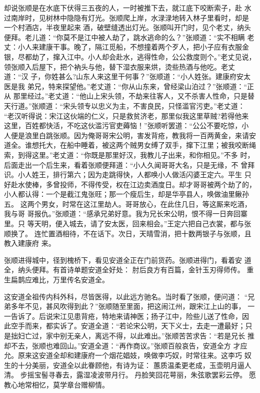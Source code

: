 却说张顺是在水底下伏得三五夜的人，一时被推下去，就江底下咬断索子，赴
水过南岸时，见树林中隐隐有灯光。张顺爬上岸，水渌渌地转入林子里看时，却是
一个村酒店，半夜里起来酒，破壁缝透出灯光。张顺叫开门时，见个老丈，纳头
便拜。老儿道：“你莫不是江中被人劫了，跳水逃命的么？”张顺道：“实不相瞒
老丈：小人来建康干事。晚了，隔江觅船，不想撞着两个歹人，把小子应有衣服金
银，尽都劫了，撺入江中。小人却会赴水，逃得性命，公公救度则个。”老丈见说，
领张顺入后屋下，把个衲头与他，替下湿衣服来烘，烫些热酒与他吃。老丈道：“汉
子，你姓甚么?山东人来这里干何事？”张顺道：“小人姓张。建康府安太医是我
弟兄，特来探望他。”老丈道：“你从山东来，曾经梁山泊过？”张顺道：“正从
那里经过。”老丈道：“他山上宋头领，不劫来往客人，又不杀害人性命，只是替
天行道。”张顺道：“宋头领专以忠义为主，不害良民，只怪滥官污吏。”老丈道：
“老汉听得说：宋江这伙端的仁义，只是救贫济老，那里似我这里草贼?若得他来
这里，百姓都快活，不吃这伙滥污官吏薅恼！”张顺听罢道：“公公不要吃惊，小
人便是浪里白跳张顺。因为俺哥哥宋公明，害发背疮，教我将一百两黄金，来请安
道全。谁想托大，在船中睡着，被这两个贼男女缚了双手，撺下江里；被我咬断绳
索，到得这里。”老丈道：“你既是那里好汉，我教儿子出来，和你相见。”不多
时，后面走出一个后生来，看着张顺便拜道：“小人久闻哥哥大名，只是无缘，不
曾拜识。小人姓王，排行第六；因为走跳得快，人都唤小人做活闪婆王定六。平生
只好赴水使棒，多曾投师，不得传受，权在江边卖酒度日。却才哥哥被两个劫了的，
小人都认得：一个是截江鬼张旺；那一个瘦后生，却是华亭县人，唤做油里鳅孙五。
这两个男女，时常在这江里劫人。哥哥放心，在此住几日，等这厮来吃酒，我与哥
哥报仇。”张顺道：“感承兄弟好意。我为兄长宋公明，恨不得一日奔回寨里。只
等天明，便入城去，请了安太医，回来相会。”王定六把自己衣裳，都与张顺换了。
连忙置酒相待，不在话下。次日，天晴雪消，把十数两银子与张顺，且教入建康府
来。

张顺进得城中，径到槐桥下，看见安道全正在门前货药。张顺进得门，看着安
道全，纳头便拜。有首诗单题安道全好处：
肘后良方有百篇，金针玉刃得师传。
重生扁鹊应难比，万里传名安道全。

这安道全祖传内科外科，尽皆医得，以此远方驰名。当时看了张顺，便问道：
“兄弟多年不见，甚风吹得到此？”张顺随至里面，把这闹江州，跟宋江上山的事，
一一告诉了。后说宋江见患背疮，特地来请神医；扬子江中，险些儿送了性命，因
此空手而来，都实诉了。安道全道：“若论宋公明，天下义士，去走一遭最好；只
是拙妇亡过，家中别无亲人，离远不得，以此难出。”张顺苦苦求告：“若是兄长
推却不去，张顺也难回山。”安道全道：“再作商议。”张顺百般哀告，安道全方
才应允。原来这安道全却和建康府一个烟花娼妓，唤做李巧奴，时常往来。这李巧
奴生的十分美丽，安道全以此眷顾他，有诗为证：
蕙质温柔更老成，玉壶明月逼人清。
步摇宝髻寻春去，露湿凌波带月行。
丹脸笑回花萼丽，朱弦歌罢彩云停。
愿教心地常相忆，莫学章台赠柳情。

